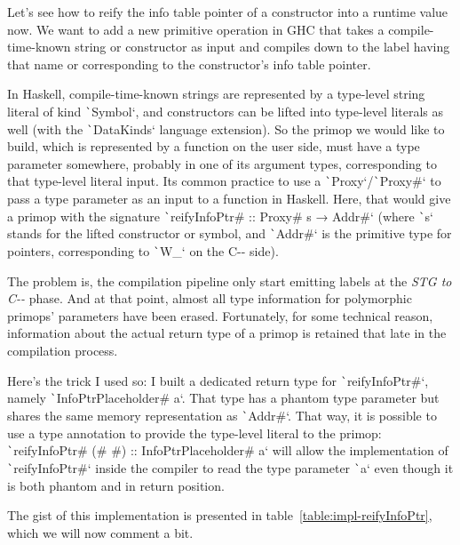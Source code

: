 \documentclass[english]{jflart}
\begin{document}
Let's see how to reify the info table pointer of a constructor into a runtime value now. We want to add a new primitive operation in GHC that takes a compile-time-known string or constructor as input and compiles down to the label having that name or corresponding to the constructor's info table pointer.

In Haskell, compile-time-known strings are represented by a type-level string literal of kind \texttt`Symbol`, and constructors can be lifted into type-level literals as well (with the \texttt`DataKinds` language extension). So the primop we would like to build, which is represented by a function on the user side, must have a type parameter somewhere, probably in one of its argument types, corresponding to that type-level literal input. Its common practice to use a \texttt`Proxy`/\texttt`Proxy#` to pass a type parameter as an input to a function in Haskell. Here, that would give a primop with the signature \texttt`reifyInfoPtr# :: Proxy# s → Addr#` (where \texttt`s` stands for the lifted constructor or symbol, and \texttt`Addr#` is the primitive type for pointers, corresponding to \texttt`W_` on the C-{}- side).

The problem is, the compilation pipeline only start emitting labels at the \emph{STG to C-{}-} phase. And at that point, almost all type information for polymorphic primops' parameters have been erased. Fortunately, for some technical reason, information about the actual return type of a primop is retained that late in the compilation process.

Here's the trick I used so: I built a dedicated return type for \texttt`reifyInfoPtr#`, namely \texttt`InfoPtrPlaceholder# a`. That type has a phantom type parameter but shares the same memory representation as \texttt`Addr#`. That way, it is possible to use a type annotation to provide the type-level literal to the primop: \texttt`reifyInfoPtr# (# #) :: InfoPtrPlaceholder# a` will allow the implementation of \texttt`reifyInfoPtr#` inside the compiler to read the type parameter \texttt`a` even though it is both phantom and in return position.

The gist of this implementation is presented in table~\ref{table:impl-reifyInfoPtr}, which we will now comment a bit.
\end{document}
